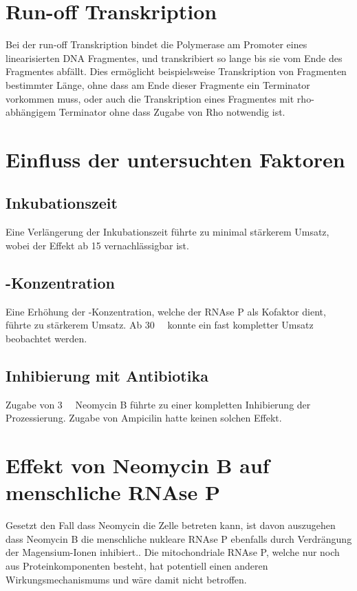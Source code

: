 \documentclass[a4paper,english]{scrreprt}
\begin{document}
\section{Run-off Transkription}

Bei der run-off Transkription bindet die Polymerase am Promoter eines
linearisierten DNA Fragmentes, und transkribiert so lange bis sie vom Ende des
Fragmentes abfällt. Dies ermöglicht beispielsweise Transkription von Fragmenten
bestimmter Länge, ohne dass am Ende dieser Fragmente ein Terminator vorkommen
muss, oder auch die Transkription eines Fragmentes mit rho-abhängigem
Terminator ohne dass Zugabe von Rho notwendig ist.

\section{Einfluss der untersuchten Faktoren}

\subsection{Inkubationszeit}

Eine Verlängerung der Inkubationszeit führte zu minimal stärkerem Umsatz, wobei
der Effekt ab \SI{15}{\min} vernachlässigbar ist.

\subsection{-Konzentration}

Eine Erhöhung der -Konzentration, welche der RNAse P als Kofaktor dient,
führte zu stärkerem Umsatz. Ab \SI{30}{\milli\Molar} konnte ein fast kompletter
Umsatz beobachtet werden.

\subsection{Inhibierung mit Antibiotika}

Zugabe von \SI{3}{\milli\Molar} Neomycin B führte zu einer kompletten
Inhibierung der Prozessierung. Zugabe von Ampicilin hatte keinen solchen
Effekt.

\section{Effekt von Neomycin B auf menschliche RNAse P}

Gesetzt den Fall dass Neomycin die Zelle betreten kann, ist davon auszugehen
dass Neomycin B die menschliche nukleare RNAse P ebenfalls durch Verdrängung
der Magensium-Ionen inhibiert.\cite{inhibition_eukaryotic_rnasep}. Die
mitochondriale RNAse P, welche nur noch aus Proteinkomponenten besteht, hat
potentiell einen anderen Wirkungsmechanismums und wäre damit nicht betroffen.
\end{document}
